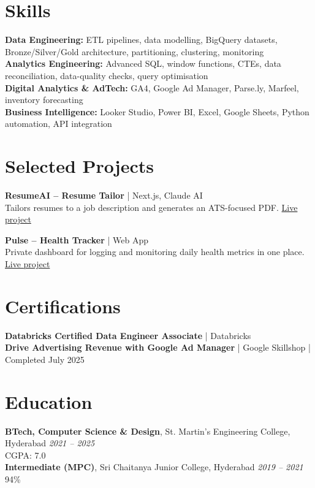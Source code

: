 \documentclass[10pt,a4paper]{article}
\begin{document}
\section*{Skills}
\textbf{Data Engineering:} ETL pipelines, data modelling, BigQuery datasets, Bronze/Silver/Gold architecture, partitioning, clustering, monitoring\\
\textbf{Analytics Engineering:} Advanced SQL, window functions, CTEs, data reconciliation, data-quality checks, query optimisation\\
\textbf{Digital Analytics \& AdTech:} GA4, Google Ad Manager, Parse.ly, Marfeel, inventory forecasting\\
\textbf{Business Intelligence:} Looker Studio, Power BI, Excel, Google Sheets, Python automation, API integration

\section*{Selected Projects}
\textbf{ResumeAI -- Resume Tailor} | Next.js, Claude AI\\
Tailors resumes to a job description and generates an ATS-focused PDF. \href{https://resume-tailor.vercel.app/}{Live project}

\textbf{Pulse -- Health Tracker} | Web App\\
Private dashboard for logging and monitoring daily health metrics in one place. \href{https://pulse-v24w.onrender.com}{Live project}

\section*{Certifications}
\textbf{Databricks Certified Data Engineer Associate} | Databricks\\
\textbf{Drive Advertising Revenue with Google Ad Manager} | Google Skillshop | Completed July 2025

\section*{Education}
\textbf{BTech, Computer Science \& Design}, St. Martin's Engineering College, Hyderabad \hfill \textit{2021 -- 2025}\\
CGPA: 7.0\\
\textbf{Intermediate (MPC)}, Sri Chaitanya Junior College, Hyderabad \hfill \textit{2019 -- 2021}\\
94\%
\end{document}
